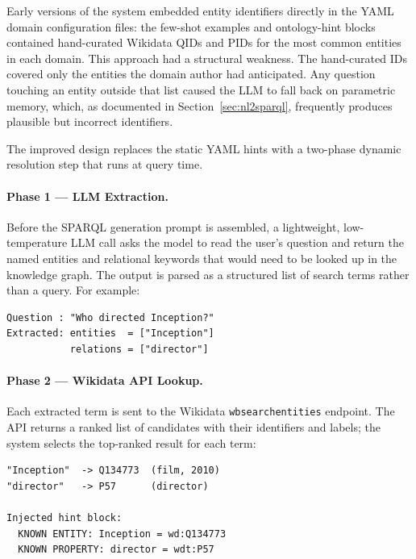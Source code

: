 \documentclass[11pt,a4paper]{article}
\begin{document}
Early versions of the system embedded entity identifiers directly in the YAML domain configuration files: the few-shot examples and ontology-hint blocks contained hand-curated Wikidata QIDs and PIDs for the most common entities in each domain. This approach had a structural weakness. The hand-curated IDs covered only the entities the domain author had anticipated. Any question touching an entity outside that list caused the LLM to fall back on parametric memory, which, as documented in Section~\ref{sec:nl2sparql}, frequently produces plausible but incorrect identifiers.

The improved design replaces the static YAML hints with a two-phase dynamic resolution step that runs at query time.

\paragraph{Phase 1 --- LLM Extraction.}
Before the SPARQL generation prompt is assembled, a lightweight, low-temperature LLM call asks the model to read the user's question and return the named entities and relational keywords that would need to be looked up in the knowledge graph. The output is parsed as a structured list of search terms rather than a query. For example:

\begin{lstlisting}[style=plainStyle, caption={LLM extraction: input question and extracted terms.}, label={lst:entity-extraction}]
Question : "Who directed Inception?"
Extracted: entities  = ["Inception"]
           relations = ["director"]
\end{lstlisting}

\paragraph{Phase 2 --- Wikidata API Lookup.}
Each extracted term is sent to the Wikidata \texttt{wbsearchentities} endpoint. The API returns a ranked list of candidates with their identifiers and labels; the system selects the top-ranked result for each term:

\begin{lstlisting}[style=plainStyle, caption={Wikidata API resolution and prompt injection.}, label={lst:entity-lookup}]
"Inception"  -> Q134773  (film, 2010)
"director"   -> P57      (director)

Injected hint block:
  KNOWN ENTITY: Inception = wd:Q134773
  KNOWN PROPERTY: director = wdt:P57
\end{lstlisting}
\end{document}

